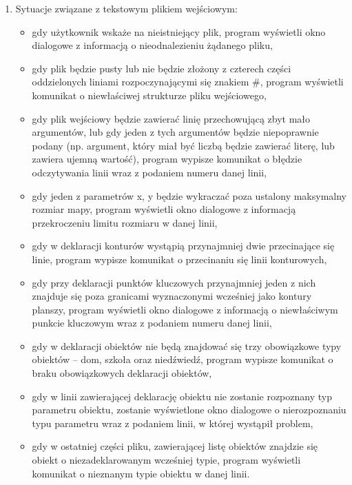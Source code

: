 \documentclass[a4paper,12pt]{article}
\begin{document}
\begin{enumerate}

\item Sytuacje związane z tekstowym plikiem wejściowym:
\begin{itemize}
\item gdy użytkownik wskaże na nieistniejący plik, program wyświetli okno dialogowe z informacją o nieodnalezieniu żądanego pliku,
\item gdy plik będzie pusty lub nie będzie złożony z czterech części oddzielonych liniami rozpoczynającymi się znakiem \#, program wyświetli komunikat o niewłaściwej strukturze pliku wejściowego,
\item gdy plik wejściowy będzie zawierać linię przechowującą zbyt mało argumentów, lub gdy jeden z tych argumentów będzie niepoprawnie podany (np. argument, który miał być liczbą będzie zawierać literę, lub zawiera ujemną wartość), program wypisze komunikat o błędzie odczytywania linii wraz z podaniem numeru danej linii,
\item gdy jeden z parametrów x, y będzie wykraczać poza ustalony maksymalny rozmiar mapy, program wyświetli okno dialogowe z informacją przekroczeniu limitu rozmiaru w danej linii,
\item gdy w deklaracji konturów wystąpią przynajmniej dwie przecinające się linie, program wypisze komunikat o przecinaniu się linii konturowych,
\item gdy przy deklaracji punktów kluczowych przynajmniej jeden z nich znajduje się poza granicami wyznaczonymi wcześniej jako kontury planszy, program wyświetli okno dialogowe z informacją o niewłaściwym punkcie kluczowym wraz z podaniem numeru danej linii,
\item gdy w deklaracji obiektów nie będą znajdować się trzy obowiązkowe typy obiektów -- dom, szkoła oraz niedźwiedź, program wypisze komunikat o braku obowiązkowych deklaracji obiektów,
\item gdy w linii zawierającej deklarację obiektu nie zostanie rozpoznany typ parametru obiektu, zostanie wyświetlone okno dialogowe o nierozpoznaniu typu parametru wraz z podaniem linii, w której wystąpił problem,
\item gdy w ostatniej części pliku, zawierającej listę obiektów znajdzie się obiekt o niezadeklarowanym wcześniej typie, program wyświetli komunikat o nieznanym typie obiektu w danej linii.

\end{itemize}


\end{enumerate}
\end{document}
